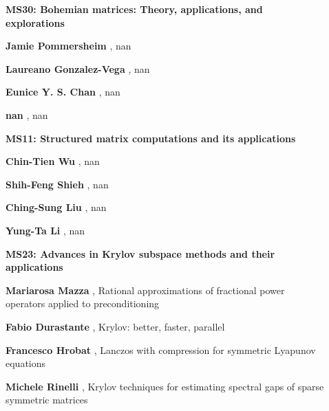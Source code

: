 \documentclass[ILAS2025-program.tex]{subfiles}
\begin{document}
\begin{description}
\begin{description}
        \end{description}
    \begin{description}
    \item[] {\color{mstitle}\textbf{MS30: Bohemian matrices: Theory, applications, and explorations}} 
    \item[] \textbf{Jamie Pommersheim} , nan
        \item[] \textbf{Laureano Gonzalez-Vega} , nan
        \item[] \textbf{Eunice Y. S. Chan} , nan
        \item[] \textbf{nan} , nan
        \end{description}
    \begin{description}
    \item[] {\color{mstitle}\textbf{MS11: Structured matrix computations and its applications}} 
    \item[] \textbf{Chin-Tien Wu} , nan
        \item[] \textbf{Shih-Feng Shieh} , nan
        \item[] \textbf{Ching-Sung Liu} , nan
        \item[] \textbf{Yung-Ta Li} , nan
        \end{description}
    \begin{description}
    \item[] {\color{mstitle}\textbf{MS23: Advances in Krylov subspace methods and their applications}} 
    \item[] \textbf{Mariarosa Mazza} , Rational approximations of fractional power operators applied to preconditioning
        \item[] \textbf{Fabio Durastante} , Krylov: better, faster, parallel
        \item[] \textbf{Francesco Hrobat} , Lanczos with compression for symmetric Lyapunov equations
        \item[] \textbf{Michele Rinelli} , Krylov techniques for estimating spectral gaps of sparse symmetric matrices
        \end{description}
    \end{description}
    \newpage
\end{document}
